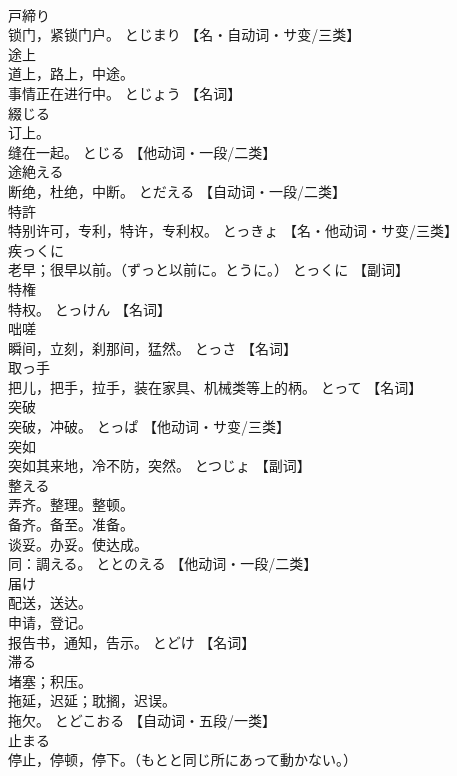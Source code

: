\documentclass[8pt]{extreport}
\begin{document}
\begin{CJK}{UTF8}{min}
\\	戸締り	
\\	锁门，紧锁门户。	とじまり		【名・自动词・サ变/三类】
\\	途上	
\\	道上，路上，中途。 
\\	事情正在进行中。	とじょう		【名词】
\\	綴じる	
\\	订上。 
\\	缝在一起。	とじる		【他动词・一段/二类】
\\	途絶える	
\\	断绝，杜绝，中断。	とだえる		【自动词・一段/二类】
\\	特許	
\\	特别许可，专利，特许，专利权。	とっきょ		【名・他动词・サ变/三类】
\\	疾っくに	
\\	老早；很早以前。（ずっと以前に。とうに。）	とっくに		【副词】
\\	特権	
\\	特权。	とっけん		【名词】
\\	咄嗟	
\\	瞬间，立刻，刹那间，猛然。	とっさ		【名词】
\\	取っ手	
\\	把儿，把手，拉手，装在家具、机械类等上的柄。	とって		【名词】
\\	突破	
\\	突破，冲破。	とっぱ		【他动词・サ变/三类】
\\	突如	
\\	突如其来地，冷不防，突然。	とつじょ		【副词】
\\	整える	
\\	弄齐。整理。整顿。 
\\	备齐。备至。准备。 
\\	谈妥。办妥。使达成。 
\\	同：調える。	ととのえる		【他动词・一段/二类】
\\	届け	
\\	配送，送达。 
\\	申请，登记。 
\\	报告书，通知，告示。	とどけ		【名词】
\\	滞る	
\\	堵塞；积压。 
\\	拖延，迟延；耽搁，迟误。 
\\	拖欠。	とどこおる		【自动词・五段/一类】
\\	止まる	
\\	停止，停顿，停下。（もとと同じ所にあって動かない。） 

\end{CJK}
\end{document}
